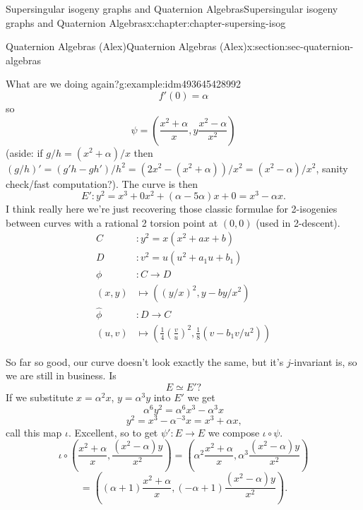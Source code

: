 \documentclass[oneside,10pt,]{book}
\numberwithin{equation}{section}
\newcommand{\amp}{&}
\begin{document}
\begin{chapterptx}{Supersingular isogeny graphs and Quaternion Algebras}{}{Supersingular isogeny graphs and Quaternion Algebras}{}{}{x:chapter:chapter-supersing-isog}
\begin{sectionptx}{Quaternion Algebras (Alex)}{}{Quaternion Algebras (Alex)}{}{}{x:section:sec-quaternion-algebras}
\begin{introduction}{}
\begin{example}{What are we doing again?}{g:example:idm493645428992}
\begin{equation*}
f'(0) = \alpha
\end{equation*}
so%
\begin{equation*}
\psi= \left(\frac{x^2 + \alpha}{x}, y\frac{x^2 - \alpha}{x^2} \right)
\end{equation*}
(aside: if \(g/h = (x^2+\alpha)/x\) then \((g/h)' = (g' h - g h')/h^2 = (2x^2 - (x^2 + \alpha))/x^2 = (x^2 - \alpha)/x^2\), sanity check\slash{}fast computation?). The curve is then%
\begin{equation*}
E'\colon y^2 = x^3 + 0x^2 + (\alpha - 5\alpha)x +0 = x^3  - \alpha x\text{.}
\end{equation*}
I think really here we're just recovering those classic formulae for 2-isogenies between curves with a rational 2 torsion point at \((0,0)\) (used in 2-descent).%
\begin{align*}
C\amp\colon y^2 = x(x^2+ax+b)\\
D\amp\colon v^2 = u(u^2+a_1u+b_1)\\
\phi\amp\colon C\to D\\
(x,y) \amp\mapsto ((y/x)^2 , y-by/x^2)\\
\hat\phi\amp\colon D\to C\\
(u,v) \amp\mapsto \left(\frac14\left(\frac vu\right)^2 ,\frac18( v-b_1 v/u^2)\right)
\end{align*}
%
\par
So far so good, our curve doesn't look exactly the same, but it's \(j\)-invariant is, so we are still in business. Is%
\begin{equation*}
E \simeq E'\text{?}
\end{equation*}
If we substitute \(x= \alpha^2 x\), \(y = \alpha ^3 y\) into \(E'\) we get%
\begin{equation*}
\alpha^6 y^2 = \alpha^6 x^3 - \alpha^3 x
\end{equation*}
%
\begin{equation*}
y^2 = x^3 - \alpha^{-3} x = x^3 +\alpha x\text{,}
\end{equation*}
call this map \(\iota\). Excellent, so to get \(\psi' \colon E\to E\) we compose \(\iota\circ \psi\).%
\begin{equation*}
\iota \circ\left( \frac{x^2  + \alpha}{x}, \frac{(x^2 - \alpha )y}{x^2}\right)  = \left( \alpha^2\frac{x^2  + \alpha}{x}, \alpha^3\frac{(x^2 - \alpha )y}{x^2}\right)
\end{equation*}
%
\begin{equation*}
= \left( (\alpha+  1)\frac{x^2  + \alpha}{x}, ( -\alpha  + 1)\frac{(x^2 - \alpha )y}{x^2}\right)\text{.}
\end{equation*}

\end{example}
\end{introduction}
\end{sectionptx}
\end{chapterptx}
\end{document}
